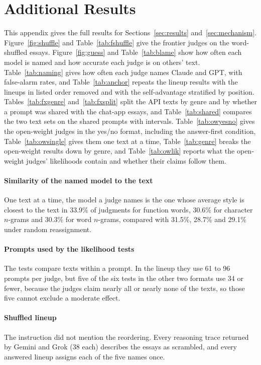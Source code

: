 \section{Additional Results}
\label{app:more}

This appendix gives the full results for Sections~\ref{sec:results}
and~\ref{sec:mechanism}. Figure~\ref{fig:shuffle} and Table~\ref{tab:fshuffle}
give the frontier judges on the word-shuffled essays. Figure~\ref{fig:guess}
and Table~\ref{tab:blame} show how often each model is named and how accurate
each judge is on others' text. Table~\ref{tab:naming} gives how often each
judge names Claude and GPT, with false-alarm rates, and Table~\ref{tab:anchor}
repeats the lineup results with the lineups in listed order removed and with
the self-advantage stratified by position. Tables~\ref{tab:fxgenre}
and~\ref{tab:fxsplit} split the API texts by genre and by whether a prompt was
shared with the chat-app essays, and Table~\ref{tab:shared} compares the two
text sets on the shared prompts with intervals. Table~\ref{tab:owyesno} gives
the open-weight judges in the yes/no format, including the answer-first
condition, Table~\ref{tab:owsingle} gives them one text at a time,
Table~\ref{tab:genre} breaks the open-weight results down by genre, and
Table~\ref{tab:owlik} reports what the open-weight judges' likelihoods contain
and whether their claims follow them.

\paragraph{Similarity of the named model to the text} One text at a time, the
model a judge names is the one whose average style is closest to the text in
33.9\% of judgments for function words, 30.6\% for character $n$-grams and
30.3\% for word $n$-grams, compared with 31.5\%, 28.7\% and 29.1\% under random
reassignment.

\paragraph{Prompts used by the likelihood tests} The tests compare texts
within a prompt. In the lineup they use 61 to 96 prompts per judge, but five of the six tests in the
other two formats use 34 or fewer, because the judges claim nearly all or
nearly none of the texts, so those five cannot exclude a moderate effect.

\paragraph{Shuffled lineup} The instruction did not mention the reordering.
Every reasoning trace returned by Gemini and Grok (38 each) describes the
essays as scrambled, and every answered lineup assigns each of the five names
once.

